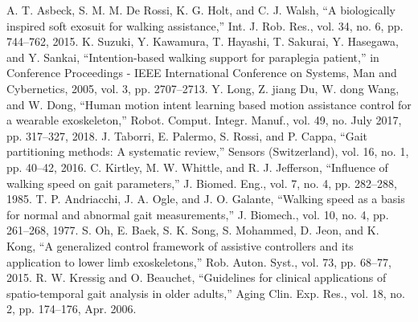 \documentclass[paper,JRM,paper]{jaciiiarticle}
\begin{document}
\begin{thebibliography}{99}
	A. T. Asbeck, S. M. M. De Rossi, K. G. Holt, and C. J. Walsh, “A biologically inspired soft exosuit for walking assistance,” Int. J. Rob. Res., vol. 34, no. 6, pp. 744–762, 2015.
	K. Suzuki, Y. Kawamura, T. Hayashi, T. Sakurai, Y. Hasegawa, and Y. Sankai, “Intention-based walking support for paraplegia patient,” in Conference Proceedings - IEEE International Conference on Systems, Man and Cybernetics, 2005, vol. 3, pp. 2707–2713.
	Y. Long, Z. jiang Du, W. dong Wang, and W. Dong, “Human motion intent learning based motion assistance control for a wearable exoskeleton,” Robot. Comput. Integr. Manuf., vol. 49, no. July 2017, pp. 317–327, 2018.
	J. Taborri, E. Palermo, S. Rossi, and P. Cappa, “Gait partitioning methods: A systematic review,” Sensors (Switzerland), vol. 16, no. 1, pp. 40–42, 2016.
	C. Kirtley, M. W. Whittle, and R. J. Jefferson, “Influence of walking speed on gait parameters,” J. Biomed. Eng., vol. 7, no. 4, pp. 282–288, 1985.
	T. P. Andriacchi, J. A. Ogle, and J. O. Galante, “Walking speed as a basis for normal and abnormal gait measurements,” J. Biomech., vol. 10, no. 4, pp. 261–268, 1977.
	S. Oh, E. Baek, S. K. Song, S. Mohammed, D. Jeon, and K. Kong, “A generalized control framework of assistive controllers and its application to lower limb exoskeletons,” Rob. Auton. Syst., vol. 73, pp. 68–77, 2015.
	R. W. Kressig and O. Beauchet, “Guidelines for clinical applications of spatio-temporal gait analysis in older adults,” Aging Clin. Exp. Res., vol. 18, no. 2, pp. 174–176, Apr. 2006.


\end{thebibliography}
\end{document}
